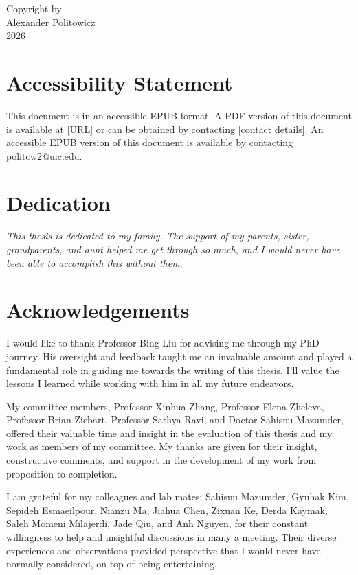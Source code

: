 \documentclass[12pt,reqno,oneside]{amsbook}
\theoremstyle{definition}
\newcommand{\?}{\stackrel{?}{=}}
\def\copyrightpage{
   \newpage\thispagestyle{empty}
   \vspace*{2.5in}
   \begin{center}
      Copyright by\\ Alexander Politowicz \\ 2026
   \end{center}
   \vfill\eject}
\begin{document}
\setcounter{page}{2} %

\copyrightpage

\chapter*{Accessibility Statement}
\iflatexml
\noindent
This document is in an accessible EPUB format. A PDF version of this document is available at [URL] or can be obtained by contacting [contact details].
\else
\noindent
An accessible EPUB version of this document is available by contacting politow2@uic.edu.
\fi


\chapter*{Dedication}

\textit{
This thesis is dedicated to my family. The support of my parents, sister, grandparents, and aunt helped me get through so much, and I would never have been able to accomplish this without them.
}

\chapter*{Acknowledgements}

I would like to thank Professor Bing Liu for advising me through my PhD journey. His oversight and feedback taught me an invaluable amount and played a fundamental role in guiding me towards the writing of this thesis. I'll value the lessons I learned while working with him in all my future endeavors.

My committee members, Professor Xinhua Zhang, Professor Elena Zheleva, Professor Brian Ziebart, Professor Sathya Ravi, and Doctor Sahisnu Mazumder, offered their valuable time and insight in the evaluation of this thesis and my work as members of my committee. My thanks are given for their insight, constructive comments, and support in the development of my work from proposition to completion.

I am grateful for my colleagues and lab mates: Sahisnu Mazumder, Gyuhak Kim, Sepideh Esmaeilpour, Nianzu Ma, Jiahua Chen, Zixuan Ke, Derda Kaymak, Saleh Momeni Milajerdi, Jade Qiu, and Anh Nguyen, for their constant willingness to help and insightful discussions in many a meeting. Their diverse experiences and observations provided perspective that I would never have normally considered, on top of being entertaining.
\end{document}
